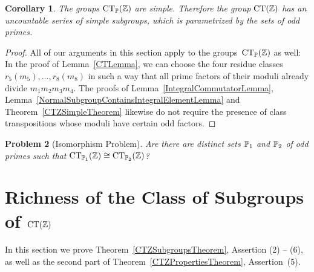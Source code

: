 \documentclass{amsart}
\theoremstyle{definition} \newtheorem{CTZDefinition}{Definition}[section]
\theoremstyle{plain}      \newtheorem{CTZPropertiesTheorem}[CTZDefinition]{Theorem}
\theoremstyle{plain}      \newtheorem{CTZSubgroupsTheorem}[CTZDefinition]{Theorem}
\theoremstyle{definition} \newtheorem{RcwaMappingDefinition}{Definition}[section]
\theoremstyle{definition} \newtheorem{RCWADefinition}[RcwaMappingDefinition]{Definition}
\theoremstyle{plain}      \newtheorem{CTZNotFinitelyGeneratedTheorem}
\theoremstyle{definition} \newtheorem{CTZSmEmbeddingDefinition}[RcwaMappingDefinition]{Definition}
\theoremstyle{plain}      \newtheorem{CTZHighlyTransitiveTheorem}[RcwaMappingDefinition]{Theorem}
\theoremstyle{plain}      \newtheorem{CTZTorsionElementsDivisibleTheorem}
\theoremstyle{plain}      \newtheorem{CTLemma}{Lemma}[section]
\theoremstyle{plain}      \newtheorem{IntegralCommutatorLemma}[CTLemma]{Lemma}
\theoremstyle{plain}      \newtheorem{NormalSubgroupContainsIntegralElementLemma}[CTLemma]{Lemma}
\theoremstyle{plain}      \newtheorem{CTZSimpleTheorem}[CTLemma]{Theorem}
\theoremstyle{remark}     \newtheorem{CTZSimpleRemark}[CTLemma]{Remark}
\theoremstyle{definition} \newtheorem{CTPZDefinition}[CTLemma]{Definition}
\theoremstyle{plain}      \newtheorem{CTPZSimpleCorollary}[CTLemma]{Corollary}
\theoremstyle{plain}      \newtheorem{CTPZSimpleProblem}[CTLemma]{Problem}
\theoremstyle{plain}      \newtheorem{FnPSL2ZEmbeddingTheorem}{Theorem}[section]
\theoremstyle{plain}      \newtheorem{FreeProductEmbeddingTheorem}[FnPSL2ZEmbeddingTheorem]{Theorem}
\theoremstyle{definition} \newtheorem{RestrictionMonomorphismDefinition}
\theoremstyle{plain}      \newtheorem{DirectAndWreathProductsEmbeddingTheorem}
\theoremstyle{plain}      \newtheorem{DirectAndWreathProductsEmbeddingCorollary}
\theoremstyle{definition} \newtheorem{CTintZDefinition}[FnPSL2ZEmbeddingTheorem]{Definition}
\theoremstyle{plain}      \newtheorem{CTintZSimpleTheorem}[FnPSL2ZEmbeddingTheorem]{Theorem}
\theoremstyle{definition} \newtheorem{KernelDefinition}{Definition}[section]
\theoremstyle{definition} \newtheorem{TameWildDefinition}[KernelDefinition]{Definition}
\theoremstyle{definition} \newtheorem{SimpleSupergroupsDefinition}[KernelDefinition]{Definition}
\theoremstyle{definition} \newtheorem{CSCRDefinition}[KernelDefinition]{Definition}
\theoremstyle{plain}      \newtheorem{SimpleSupergroupsGeneratorsTheorem}[KernelDefinition]{Theorem}
\theoremstyle{plain}      \newtheorem{SimpleSupergroupsTheorem}[KernelDefinition]{Theorem}
\theoremstyle{plain}      \newtheorem{SimpleSupergroupsTransitivityTheorem}
\theoremstyle{plain}      \newtheorem{TameGenerationConjecture}[KernelDefinition]{Conjecture}
\theoremstyle{remark}     \newtheorem{TameGenerationRemark}[KernelDefinition]{Remark}
\begin{document}
\begin{CTPZSimpleCorollary} \label{CTPZSimpleCorollary}
  The groups \(\CTP{\ZZ}\) are simple. Therefore the group \(\CT{\ZZ}\) has an uncountable
  series of simple subgroups, which is parametrized by the sets of odd primes.
\end{CTPZSimpleCorollary}
\begin{proof}
  All of our arguments in this section apply to the groups~\(\CTP{\ZZ}\) as well:
  In the proof of Lemma~\ref{CTLemma}, we can choose the four residue classes
  \(r_5(m_5), \dots, r_8(m_8)\) in such a way that all prime factors of their moduli
  already divide \(m_1 m_2 m_3 m_4\). The proofs of Lemma~\ref{IntegralCommutatorLemma},
  Lemma~\ref{NormalSubgroupContainsIntegralElementLemma} and Theorem~\ref{CTZSimpleTheorem}
  likewise do not require the presence of class transpositions whose moduli have certain
  odd factors.
\end{proof}

\begin{CTPZSimpleProblem}[Isomorphism Problem] \label{CTPZSimpleProblem}
  Are there are distinct sets \(\mathbb{P}_1\) and \(\mathbb{P}_2\) of odd primes such that
  \(\CTPk{1}{\ZZ} \cong \CTPk{2}{\ZZ}\)?
\end{CTPZSimpleProblem}

\goodbreak

\section{Richness of the Class of Subgroups of \(\CT{\ZZ}\)} \label{CTZSubgroupsSection}

In this section we prove Theorem~\ref{CTZSubgroupsTheorem}, Assertion (2) -- (6),
as well as the second part of Theorem~\ref{CTZPropertiesTheorem}, Assertion~(5).

\goodbreak
\end{document}
